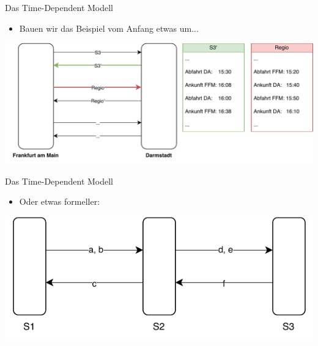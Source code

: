 

%


\begin{frame}{Das Time-Dependent Modell}
	\begin{itemize}
		\item Bauen wir das Beispiel vom Anfang etwas um...
	\end{itemize}

	\begin{center}
		\includegraphics[width=\linewidth]{images/time-dependent/basic.pdf}
	\end{center}
\end{frame}

\begin{frame}{Das Time-Dependent Modell}
	\begin{itemize}
		\item Oder etwas formeller:
	\end{itemize}

	\begin{center}
		\includegraphics[width=\linewidth]{images/time-dependent/formal.pdf}
	\end{center}
\end{frame}


